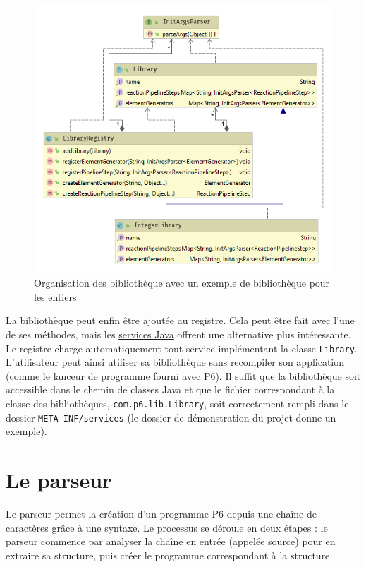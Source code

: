\documentclass[a4paper, 12pt]{article}
\newcommand{\inline}[1]{\texttt{#1}}
\begin{document}
\begin{figure}[!ht]
  \centering
  \includegraphics[scale=0.8]{./img/Library.png}
  \caption{Organisation des bibliothèque avec un exemple de bibliothèque pour les entiers}
\end{figure}

La bibliothèque peut enfin être ajoutée au registre. Cela peut être fait avec l’une de ses méthodes, mais les \href{https://docs.oracle.com/javase/tutorial/ext/basics/spi.html}{services Java} offrent une alternative plus intéressante. Le registre charge automatiquement tout service implémentant la classe \inline{Library}. L’utilisateur peut ainsi utiliser sa bibliothèque sans recompiler son application (comme le lanceur de programme fourni avec P6). Il suffit que la bibliothèque soit accessible dans le chemin de classes Java et que le fichier correspondant à la classe des bibliothèques, \inline{com.p6.lib.Library}, soit correctement rempli dans le dossier \inline{META-INF/services} (le dossier de démonstration du projet donne un exemple).

\section{Le parseur}
Le parseur permet la création d’un programme P6 depuis une chaîne de caractères grâce à une syntaxe. Le processus se déroule en deux étapes : le parseur commence par analyser la chaîne en entrée (appelée source) pour en extraire sa structure, puis créer le programme correspondant à la structure.
\end{document}
